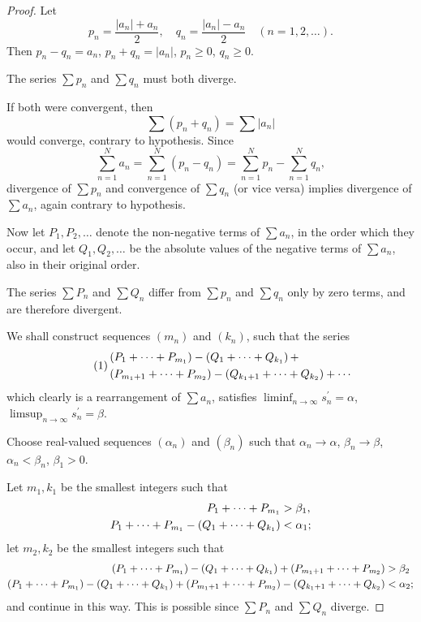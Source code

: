 \begin{proof}
Let
\[p_n=\frac{|a_n|+a_n}{2},\quad q_n=\frac{|a_n|-a_n}{2}\quad(n=1,2,\dots).\]
Then $p_n-q_n=a_n$, $p_n+q_n=|a_n|$, $p_n\ge0$, $q_n\ge0$. 

\begin{claim}
The series $\sum p_n$ and $\sum q_n$ must both diverge.
\end{claim}
If both were convergent, then
\[\sum(p_n+q_n)=\sum|a_n|\]
would converge, contrary to hypothesis. Since
\[\sum_{n=1}^{N}a_n=\sum_{n=1}^{N}(p_n-q_n)=\sum_{n=1}^{N}p_n-\sum_{n=1}^{N}q_n,\]
divergence of $\sum p_n$ and convergence of $\sum q_n$ (or vice versa) implies divergence of $\sum a_n$, again contrary to hypothesis.

Now let $P_1,P_2,\dots$ denote the non-negative terms of $\sum a_n$, in the order which they occur, and let $Q_1,Q_2,\dots$ be the absolute values of the negative terms of $\sum a_n$, also in their original order.

The series $\sum P_n$ and $\sum Q_n$ differ from $\sum p_n$ and $\sum q_n$ only by zero terms, and are therefore divergent.

We shall construct sequences $(m_n)$ and $(k_n)$, such that the series
\begin{equation*}\tag{1}
\begin{split}
&\left(P_1+\cdots+P_{m_1}\right)-\left(Q_1+\cdots+Q_{k_1}\right)+\\
&\left(P_{m_1+1}+\cdots+P_{m_2}\right)-\left(Q_{k_1+1}+\cdots+Q_{k_2}\right)+\cdots
\end{split}
\end{equation*}
which clearly is a rearrangement of $\sum a_n$, satisfies $\displaystyle\liminf_{n\to\infty}s_n^\prime=\alpha$, $\displaystyle\limsup_{n\to\infty}s_n^\prime=\beta$.

Choose real-valued sequences $(\alpha_n)$ and $(\beta_n)$ such that $\alpha_n\to\alpha$, $\beta_n\to\beta$, $\alpha_n<\beta_n$, $\beta_1>0$.

Let $m_1,k_1$ be the smallest integers such that
\begin{align*}
P_1+\cdots+P_{m_1}&>\beta_1,\\
P_1+\cdots+P_{m_1}-\left(Q_1+\cdots+Q_{k_1}\right)&<\alpha_1;
\end{align*}
let $m_2,k_2$ be the smallest integers such that
\begin{align*}
\left(P_1+\cdots+P_{m_1}\right)-\left(Q_1+\cdots+Q_{k_1}\right)+\left(P_{m_1+1}+\cdots+P_{m_2}\right)&>\beta_2\\
\left(P_1+\cdots+P_{m_1}\right)-\left(Q_1+\cdots+Q_{k_1}\right)+\left(P_{m_1+1}+\cdots+P_{m_2}\right)-\left(Q_{k_1+1}+\cdots+Q_{k_2}\right)&<\alpha_2;
\end{align*}
and continue in this way. This is possible since $\sum P_n$ and $\sum Q_n$ diverge.


\end{proof}
